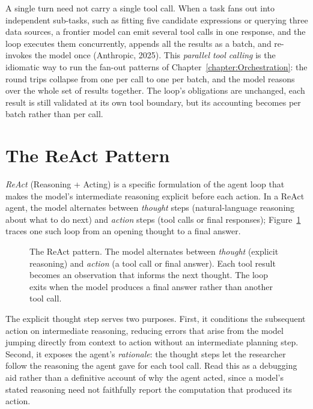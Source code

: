 \begin{remark}
A single turn need not carry a single tool call.
When a task fans out into independent sub-tasks, such as fitting five candidate expressions or querying three data sources, a frontier model can emit several tool calls in one response, and the loop executes them concurrently, appends all the results as a batch, and re-invokes the model once (Anthropic, 2025).
This \emph{parallel tool calling} is the idiomatic way to run the fan-out patterns of Chapter~\ref{chapter:Orchestration}: the round trips collapse from one per call to one per batch, and the model reasons over the whole set of results together.
The loop's obligations are unchanged, each result is still validated at its own tool boundary, but its accounting becomes per batch rather than per call.
\end{remark}

\section{The ReAct Pattern}
\label{section:ReAct}

\emph{ReAct} (Reasoning + Acting) is a specific formulation of the agent loop that makes the model's intermediate reasoning explicit before each action.
In a ReAct agent, the model alternates between \emph{thought} steps (natural-language reasoning about what to do next) and \emph{action} steps (tool calls or final responses); Figure~\ref{figure:ReAct} traces one such loop from an opening thought to a final answer.

\begin{figure}[htb!]
\begin{center}

\caption{The ReAct pattern.
The model alternates between \emph{thought} (explicit reasoning) and \emph{action} (a tool call or final answer).
Each tool result becomes an observation that informs the next thought.
The loop exits when the model produces a final answer rather than another tool call.}
\label{figure:ReAct}
\end{center}
\end{figure}

The explicit thought step serves two purposes.
First, it conditions the subsequent action on intermediate reasoning, reducing errors that arise from the model jumping directly from context to action without an intermediate planning step.
Second, it exposes the agent's \emph{rationale}: the thought steps let the researcher follow the reasoning the agent gave for each tool call. Read this as a debugging aid rather than a definitive account of why the agent acted, since a model's stated reasoning need not faithfully report the computation that produced its action.

